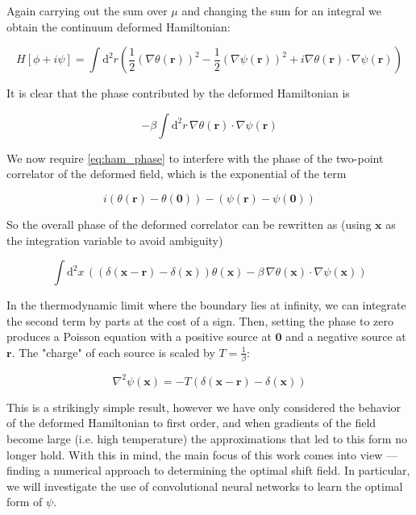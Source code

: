 \documentclass[12pt]{article}
\begin{document}
Again carrying out the sum over $\mu$ and changing the sum for an integral we obtain the continuum deformed Hamiltonian:

\begin{equation*}
	H[\phi + i\psi] = \int \mathrm{d}^2r \left(\frac{1}{2}(\nabla \theta(\mathbf{r}))^2 - \frac{1}{2}(\nabla \psi(\mathbf{r}))^2 + i \nabla\theta(\mathbf{r}) \cdot \nabla\psi(\mathbf{r}) \right)
\end{equation*}

It is clear that the phase contributed by the deformed Hamiltonian is 

\begin{equation} \label{eq:ham_phase}
	{-\beta\int\mathrm{d}^2r \, \nabla\theta(\mathbf{r})\cdot\nabla\psi(\mathbf{r})}
\end{equation}

We now require \ref{eq:ham_phase} to interfere with the phase of the two-point correlator of the deformed field, which is 
the exponential of the term

\begin{equation*}
	i(\theta(\mathbf{r}) - \theta(\mathbf{0})) -(\psi(\mathbf{r}) - \psi(\mathbf{0}))
\end{equation*}

So the overall phase of the deformed correlator can be rewritten as (using $\mathbf{x}$ as the integration variable to avoid ambiguity)

\begin{equation*}
	\int \mathrm{d}^2x \, \left((\delta(\mathbf{x} - \mathbf{r}) - \delta(\mathbf{x}))\theta(\mathbf{x})-\beta \, \nabla\theta(\mathbf{x})\cdot\nabla\psi(\mathbf{x})\right)
\end{equation*}

In the thermodynamic limit where the boundary lies at infinity, we can integrate the second term by parts at the cost of a sign. Then, setting
the phase to zero produces a Poisson equation with a positive source at $\mathbf{0}$ and a negative source at $\mathbf{r}$. The "charge" of each 
source is scaled by $T=\frac{1}{\beta}$:

\begin{equation} \label{eq:Poisson}
	\nabla^2 \psi(\mathbf{x}) = -T \left( \delta(\mathbf{x} - \mathbf{r}) - \delta(\mathbf{x}) \right)
\end{equation}

This is a strikingly simple result, however we have only considered the behavior of the deformed Hamiltonian to first order, and when gradients
of the field become large (i.e. high temperature) the approximations that led to this form no longer hold. With this in mind, the main focus of 
this work comes into view --- finding a numerical approach to determining the optimal shift field. In particular, we will investigate the use of 
convolutional neural networks to learn the optimal form of $\psi$.
\end{document}

